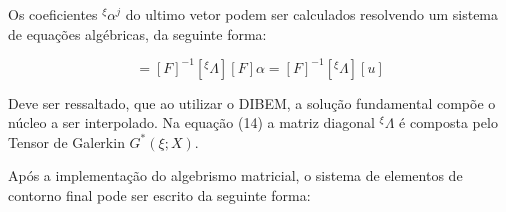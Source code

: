 \documentclass[a4paper,12p]{article}
\begin{document}
	Os coeficientes ${}^{\xi}\alpha^{j}$ do ultimo vetor podem ser calculados resolvendo um sistema de equações algébricas, da seguinte forma:
	
	\begin{equation}
	[{}^{\xi}\alpha] = [F]^{-1}[{}^{\xi}\Lambda][F]\alpha = [F]^{-1}[{}^{\xi}\Lambda][u]
	\end{equation}
	
	Deve ser ressaltado, que ao utilizar o DIBEM, a solução fundamental compõe o núcleo a ser interpolado. Na equação (14) a matriz diagonal ${}^{\xi}\Lambda$ é composta pelo Tensor de Galerkin $G^{*}(\xi;X)$.
	
	\pagebreak
	
	Após a implementação do algebrismo matricial, o sistema de elementos de contorno final pode ser escrito da seguinte forma:
	
\end{document}
